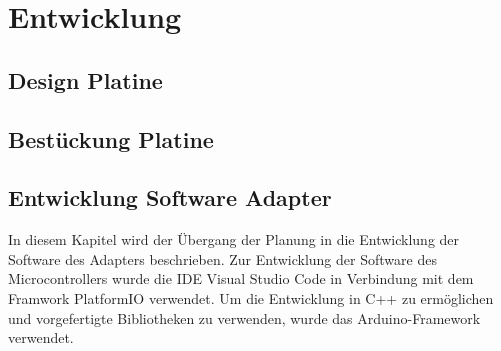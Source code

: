 \documentclass[]{article}
\begin{document}
\section{Entwicklung}
\subsection{Design Platine}
\subsection{Bestückung Platine}
\subsection{Entwicklung Software Adapter}
In diesem Kapitel wird der Übergang der Planung in die Entwicklung der Software des Adapters beschrieben. 
Zur Entwicklung der Software des Microcontrollers wurde die IDE Visual Studio Code in Verbindung mit dem Framwork PlatformIO verwendet. Um die Entwicklung in C++ zu ermöglichen und vorgefertigte Bibliotheken zu verwenden, wurde das Arduino-Framework verwendet.
\end{document}
